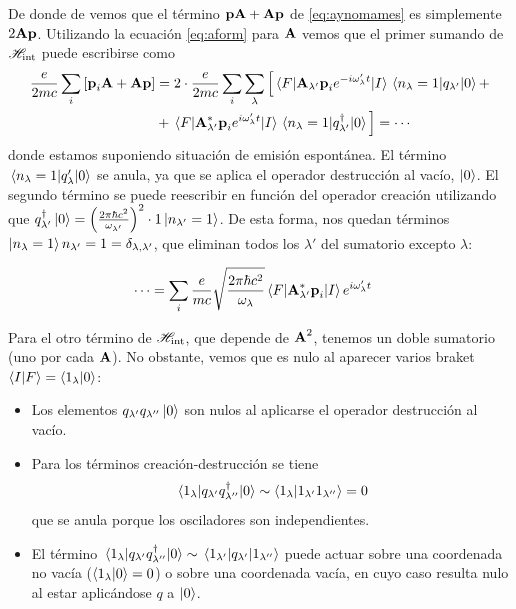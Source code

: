 De donde de vemos que el término
$\bm{\mathrm{p}}\bm{\mathrm{A}}+\bm{\mathrm{A}}\bm{\mathrm{p}}$ de \eqref{eq:aynomames} es
simplemente $2 \bm{\mathrm{A}}\bm{\mathrm{p}}$. Utilizando la ecuación
\eqref{eq:aform} para $\bm{\mathrm{A}}$ vemos que el primer sumando de $\mathscr{H}_\text{int}$ 
puede escribirse como
\begin{equation}
  \begin{split}
    \frac{e}{2mc} \sum_{i} \left[ \bm{\mathrm{p}}_i \bm{\mathrm{A}} +
      \bm{\mathrm{A}}\bm{\mathrm{p}} \right] &= 2\cdot\frac{e}{2mc} \sum_{i} \sum_{\lambda} \Big[
    \mel{F}{\bm{\mathrm{A}}_{\lambda'}\bm{\mathrm{p}}_i e^{-i\omega'_\lambda
        t}}{I} \mel{n_\lambda = 1}{q_{\lambda'}}{0} +  \\
    &+
\mel{F}{\bm{\mathrm{A}}_{\lambda'}^*\bm{\mathrm{p}}_i e^{i\omega'_\lambda
        t}}{I} \mel{n_\lambda = 1}{q_{\lambda'}^\dagger}{0} \Big]= \cdots
  \end{split}
\end{equation}
donde estamos suponiendo situación de emisión espontánea. El término
$\mel{n_\lambda=1}{q_\lambda'}{0}$ se anula, ya que se aplica el
operador destrucción al vacío, $\ket{0}$. El segundo término se puede
reescribir en función del operador creación utilizando que $q_{\lambda'}^\dagger\ket{0} = \left(
  \frac{2\pi \hbar c^2}{\omega_{\lambda'}}
\right)^2\cdot1\ket{n_{\lambda'}=1}$. De esta forma, nos quedan
términos
$\ket{n_\lambda=1}{n_{\lambda'}=1}=\delta_{\lambda,\lambda'}$, que
eliminan todos los $\lambda'$ del sumatorio excepto $\lambda$:

\begin{equation}
  \begin{split}
    \cdots &= \sum_{i} \frac{e}{mc} \sqrt{ \frac{2\pi \hbar
        c^2}{\omega_\lambda} }  
\mel{F}{\bm{\mathrm{A}}_{\lambda'}^*\bm{\mathrm{p}}_i }{I} e^{i\omega'_\lambda
        t}
  \end{split}
\end{equation}

Para el otro término de $\mathscr{H}_\text{int}$, que depende de
$\bm{\mathrm{A}}^2$, tenemos un doble sumatorio (uno por cada
$\bm{\mathrm{A}}$). No obstante, vemos que es nulo al aparecer varios
braket $\braket{I}{F}=\braket{1_\lambda}{0}$:
\begin{itemize}
\item Los elementos $q_{\lambda'}q_{\lambda''}\ket{0}$ son nulos al
  aplicarse el operador destrucción al vacío.
\item Para los términos creación-destrucción se tiene
\begin{equation}
  \mel{1_\lambda}{q_{\lambda'}q^\dagger_{\lambda''}}{0} \sim
  \braket{1_\lambda}{1_{\lambda'}1_{\lambda''}} = 0
\end{equation}
que se anula porque los osciladores son independientes.
\item El término
  $\mel{1_\lambda}{q_{\lambda'}q_{\lambda''}^\dagger}{0} \sim
  \mel{1_{\lambda'}}{q_{\lambda'}}{1_{\lambda''}}$ puede actuar sobre
  una coordenada no vacía ($\braket{1_\lambda}{0}=0$) o sobre una
  coordenada vacía, en cuyo caso resulta nulo al estar aplicándose $q$ a $\ket{0}$.
\end{itemize}

